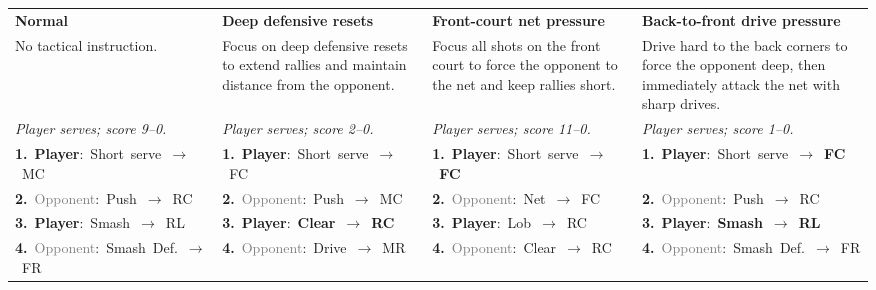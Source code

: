 \begin{table}[t]
\raggedright
\footnotesize
\renewcommand{\arraystretch}{1.10}
\begin{tabularx}{\textwidth}{*{4}{>{\raggedright\arraybackslash}X}}
\toprule
\textcolor{normalgray}{\textbf{Normal}} & \textcolor{defensiveblue}{\textbf{Deep defensive resets}} & \textcolor{frontgreen}{\textbf{Front-court net pressure}} & \textcolor{driveorange}{\textbf{Back-to-front drive pressure}} \\
\addlinespace[2pt]
No tactical instruction. & Focus on deep defensive resets to extend rallies and maintain distance from the opponent. & Focus all shots on the front court to force the opponent to the net and keep rallies short. & Drive hard to the back corners to force the opponent deep, then immediately attack the net with sharp drives. \\
\addlinespace[2pt]
\textit{Player serves; score 9--0.} & \textit{Player serves; score 2--0.} & \textit{Player serves; score 11--0.} & \textit{Player serves; score 1--0.} \\
\midrule
\mbox{\textbf{1.} \textbf{Player}: Short serve $\rightarrow$ MC} & \mbox{\textbf{1.} \textbf{Player}: Short serve $\rightarrow$ FC} & \mbox{\textbf{1.} \textbf{Player}: Short serve $\rightarrow$ \textcolor{frontgreen}{\textbf{FC}}} & \mbox{\textbf{1.} \textbf{Player}: Short serve $\rightarrow$ \textcolor{driveorange}{\textbf{FC}}} \\
\mbox{\textbf{2.} \textcolor{gray}{Opponent}: Push $\rightarrow$ RC} & \mbox{\textbf{2.} \textcolor{gray}{Opponent}: Push $\rightarrow$ MC} & \mbox{\textbf{2.} \textcolor{gray}{Opponent}: Net $\rightarrow$ FC} & \mbox{\textbf{2.} \textcolor{gray}{Opponent}: Push $\rightarrow$ RC} \\
\mbox{\textbf{3.} \textbf{Player}: Smash $\rightarrow$ RL} & \mbox{\textbf{3.} \textbf{Player}: \textcolor{defensiveblue}{\textbf{Clear}} $\rightarrow$ \textcolor{defensiveblue}{\textbf{RC}}} & \mbox{\textbf{3.} \textbf{Player}: Lob $\rightarrow$ RC} & \mbox{\textbf{3.} \textbf{Player}: \textcolor{driveorange}{\textbf{Smash}} $\rightarrow$ \textcolor{driveorange}{\textbf{RL}}} \\
\mbox{\textbf{4.} \textcolor{gray}{Opponent}: Smash Def. $\rightarrow$ FR} & \mbox{\textbf{4.} \textcolor{gray}{Opponent}: Drive $\rightarrow$ MR} & \mbox{\textbf{4.} \textcolor{gray}{Opponent}: Clear $\rightarrow$ RC} & \mbox{\textbf{4.} \textcolor{gray}{Opponent}: Smash Def. $\rightarrow$ FR} \\

\end{tabularx}
\end{table}
